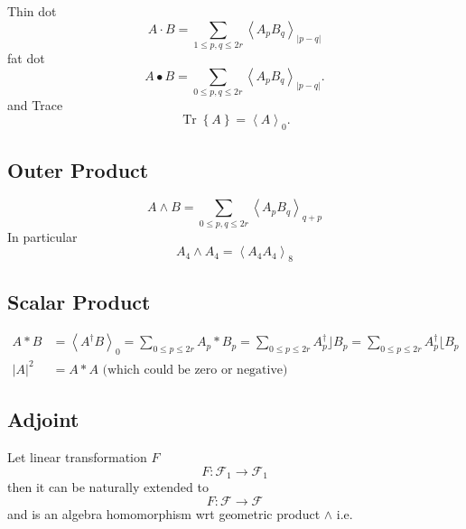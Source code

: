 \documentclass[aps,preprint]{revtex4}%
\begin{document}
Thin dot%
\begin{equation}
A\cdot B=\sum_{1\leq p,q\leq2r}\left\langle A_{p}B_{q}\right\rangle
_{\left\vert p-q\right\vert }%
\end{equation}
fat dot
\begin{equation}
A\bullet B=\sum_{0\leq p,q\leq2r}\left\langle A_{p}B_{q}\right\rangle
_{\left\vert p-q\right\vert }.
\end{equation}
and Trace%
\begin{equation}
\operatorname*{Tr}\left\{  A\right\}  =\left\langle A\right\rangle _{0}.
\end{equation}


\subsection{Outer Product}%

\begin{equation}
A\wedge B=\sum_{0\leq p,q\leq2r}\left\langle A_{p}B_{q}\right\rangle _{q+p}%
\end{equation}
In particular
\begin{equation}
A_{4}\wedge A_{4}=\left\langle A_{4}A_{4}\right\rangle _{8}%
\end{equation}


\subsection{Scalar Product}%

\begin{align}
A\ast B  &  =\left\langle A^{\dagger}B\right\rangle _{0}=\sum_{0\leq p\leq
2r}A_{p}\ast B_{p}=\sum_{0\leq p\leq2r}A_{p}^{\dagger}\rfloor B_{p}%
=\sum_{0\leq p\leq2r}A_{p}^{\dagger}\lfloor B_{p}\\
\left\vert A\right\vert ^{2}  &  =A\ast A\text{ (which could be zero or
negative)}%
\end{align}


\subsection{Adjoint}

Let linear transformation $F$
\begin{equation}
F:\mathcal{F}_{1}\rightarrow\mathcal{F}_{1}%
\end{equation}
then it can be naturally extended to
\begin{equation}
F:\mathcal{F}\rightarrow\mathcal{F}%
\end{equation}
and is an algebra homomorphism wrt geometric product $\wedge$ i.e.%
\end{document}
